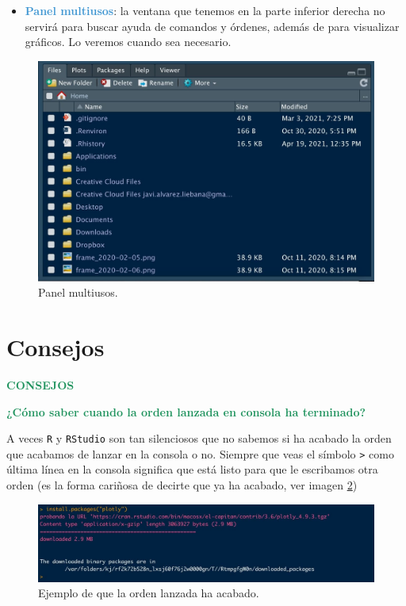 \documentclass[11pt,]{book}
\providecommand{\tightlist}{%
  \setlength{\itemsep}{0pt}\setlength{\parskip}{0pt}}
\begin{document}
\begin{itemize}
\tightlist
\item
  \textbf{\textcolor{#4197D2}{Panel multiusos}}: la ventana que tenemos en la parte inferior derecha no servirá para buscar ayuda de comandos y órdenes, además de para visualizar gráficos. Lo veremos cuando sea necesario.
\end{itemize}

\begin{figure}

{\centering \includegraphics[width=0.65\linewidth]{./img/inicio_rstudio_4} 

}

\caption{Panel multiusos.}\label{fig:inicio-rstudio-4}
\end{figure}

\hypertarget{consejos}{%
\section{Consejos}\label{consejos}}

\textbf{\textcolor{#20935E}{CONSEJOS}}

\textbf{\textcolor{#20935E}{¿Cómo saber cuando la orden lanzada en consola ha terminado?}}

A veces \texttt{R} y \texttt{RStudio} son tan silenciosos que no sabemos si ha acabado la orden que acabamos de lanzar en la consola o no. Siempre que veas el símbolo \texttt{\textgreater{}} como última línea en la consola significa que está listo para que le escribamos otra orden (es la forma cariñosa de decirte que ya ha acabado, ver imagen \ref{fig:tip-consola-lista})

\begin{figure}

{\centering \includegraphics[width=0.7\linewidth]{./img/tip_consola_lista} 

}

\caption{Ejemplo de que la orden lanzada ha acabado.}\label{fig:tip-consola-lista}
\end{figure}
\end{document}
